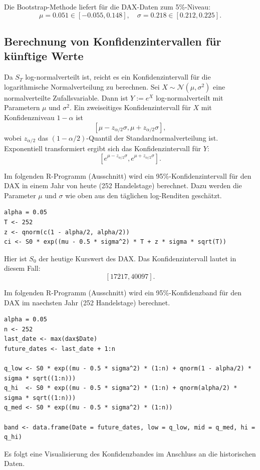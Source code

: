 Die Bootstrap-Methode liefert für die DAX-Daten zum 5\%-Niveau:
$$\mu = 0.051 \in [-0.055, 0.148], \quad \sigma = 0.218 \in [0.212, 0.225].$$

\subsection{Berechnung von Konfidenzintervallen für künftige Werte}

Da $S_T$ log-normalverteilt ist, reicht es ein Konfidenzintervall für die 
logarithmische Normalverteilung zu berechnen.
Sei $X \sim \mathcal N(\mu, \sigma^2)$ eine normalverteilte Zufallsvariable.
Dann ist $Y := e^X$ log-normalverteilt mit Parametern $\mu$ und $\sigma^2$.
Ein zweiseitiges Konfidenzintervall für $X$ mit Konfidenzniveau $1-\alpha$ ist
$$[\mu - z_{\alpha/2} \sigma, \mu + z_{\alpha/2} \sigma],$$
wobei $z_{\alpha/2}$ das $(1-\alpha/2)$-Quantil der Standardnormalverteilung ist.
Exponentiell transformiert ergibt sich das Konfidenzintervall für $Y$:
$$[e^{\mu - z_{\alpha/2} \sigma}, e^{\mu + z_{\alpha/2} \sigma}].$$

\begin{bsp}

Im folgenden R-Programm (Ausschnitt) wird ein 95\%-Konfidenzintervall für den DAX in einem Jahr von heute (252 Handelstage) berechnet.
Dazu werden die Parameter $\mu$ und $\sigma$ wie oben aus den täglichen log-Renditen geschätzt.

\begin{lstlisting}
alpha = 0.05
T <- 252
z <- qnorm(c(1 - alpha/2, alpha/2))
ci <- S0 * exp((mu - 0.5 * sigma^2) * T + z * sigma * sqrt(T))
\end{lstlisting}

Hier ist $S_0$ der heutige Kurswert des DAX. Das Konfidenzintervall lautet in diesem Fall:
$$[17217, 40097].$$

\end{bsp}

\begin{bsp}

Im folgenden R-Programm (Ausschnitt) wird ein 95\%-Konfidenzband für den DAX im naechsten Jahr (252 Handelstage) berechnet.

\begin{lstlisting}
alpha = 0.05
n <- 252
last_date <- max(dax$Date)
future_dates <- last_date + 1:n

q_low <- S0 * exp((mu - 0.5 * sigma^2) * (1:n) + qnorm(1 - alpha/2) * sigma * sqrt((1:n)))
q_hi  <- S0 * exp((mu - 0.5 * sigma^2) * (1:n) + qnorm(alpha/2) * sigma * sqrt((1:n)))
q_med <- S0 * exp((mu - 0.5 * sigma^2) * (1:n))

band <- data.frame(Date = future_dates, low = q_low, mid = q_med, hi = q_hi)
\end{lstlisting}

Es folgt eine Visualisierung des Konfidenzbandes im Anschluss an die historischen Daten.

\end{bsp}

